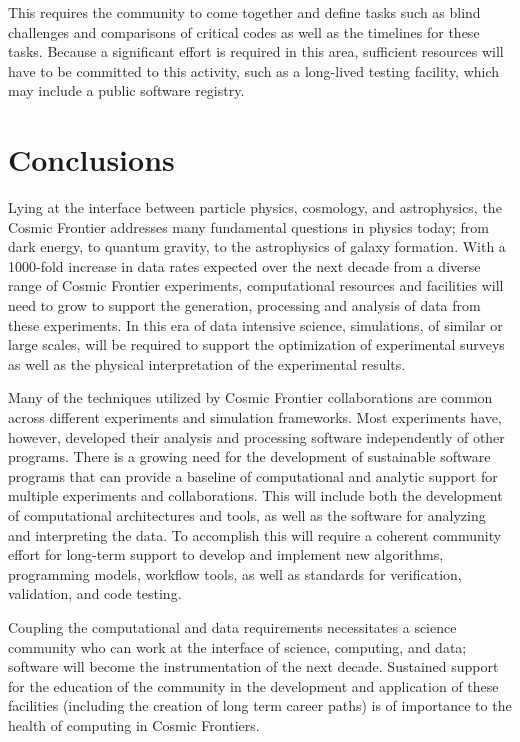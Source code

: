 This requires the community to come together and define tasks such as
blind challenges and comparisons of critical codes as well as the
timelines for these tasks. Because a significant effort is required in
this area, sufficient resources will have to be committed to this
activity, such as a long-lived testing facility, which may include a
public software registry.

\section{Conclusions}

Lying at the interface between particle physics, cosmology, and
astrophysics, the Cosmic Frontier addresses many fundamental questions
in physics today; from dark energy, to quantum gravity, to the
astrophysics of galaxy formation.  With a 1000-fold increase in data
rates expected over the next decade from a diverse range of Cosmic
Frontier experiments, computational resources and facilities will need
to grow to support the generation, processing and analysis of data
from these experiments. In this era of data intensive science,
simulations, of similar or large scales, will be required to support the
optimization of experimental surveys as well as the physical interpretation of
the experimental results.

Many of the techniques utilized by Cosmic Frontier collaborations are
common across different experiments and simulation frameworks. Most
experiments have, however, developed their analysis and processing
software independently of other programs. There is a growing need for
the development of sustainable software programs that can provide a
baseline of computational and analytic support for multiple
experiments and collaborations.  This will include both the
development of computational architectures and tools, as well as the
software for analyzing and interpreting the data.  To accomplish this
will require a coherent community effort for long-term support to
develop and implement new algorithms, programming models, workflow
tools, as well as standards for verification, validation, and code
testing.

Coupling the computational and data requirements necessitates a
science community who can work at the interface of science, computing,
and data; software will become the instrumentation of the next
decade. Sustained support for the education of the community in the
development and application of these facilities (including the
creation of long term career paths) is of importance to the health of
computing in Cosmic Frontiers.



